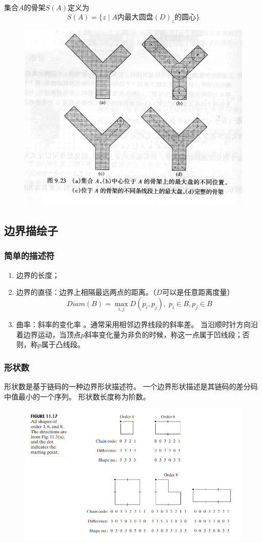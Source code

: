集合$A$的骨架$S(A)$定义为
\[S(A)=\{z\mid A\text{内最大圆盘}(D)_z\text{的圆心}\}\]
\begin{figure}[H]
\centering
\includegraphics[width=0.6\linewidth]{fig/skeletons2.png}
\end{figure}

\subsection{边界描绘子}
\subsubsection{简单的描述符}
\begin{enumerate}
\item 边界的长度；
\item 边界的直径：边界上相隔最远两点的距离。（$D$可以是任意距离度量）
\[Diam(B)=\max_{i,j}D(p_i,p_j),\;p_i\in B,p_j\in B\]
\item 曲率：斜率的变化率 。通常采用相邻边界线段的斜率差。
当沿顺时针方向沿着边界运动，当顶点$p$斜率变化量为非负的时候，称这一点属于凹线段；否则，称$p$属于凸线段。
\end{enumerate}

\subsubsection{形状数}
形状数是基于链码的一种边界形状描述符。
一个边界形状描述是其链码的差分码中值最小的一个序列。
形状数长度称为阶数。
\begin{figure}[H]
\centering
\includegraphics[width=0.8\linewidth]{fig/shape_number.png}
\end{figure}

